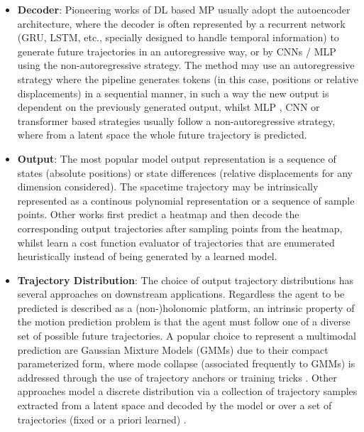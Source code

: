 \begin{itemize}
	\item \textbf{Decoder}: Pioneering works of DL based MP usually adopt the autoencoder architecture, where the decoder is often represented by a recurrent network (GRU, LSTM, etc., specially designed to handle temporal information) to generate future trajectories in an autoregressive way, or by CNNs \cite{gilles2021home} \cite{gilles2021gohome} / MLP \cite{liang2020learninggraph} \cite{schmidt2022crat} using the non-autoregressive strategy. The method may use an autoregressive strategy where the pipeline generates tokens (in this case, positions or relative displacements) in a sequential manner, in such a way the new output is dependent on the previously generated output, whilst MLP \cite{schmidt2022crat}, CNN \cite{gilles2021home} or transformer \cite{ngiam2021scene} based strategies usually follow a non-autoregressive strategy, where from a latent space the whole future trajectory is predicted.
	
	\item \textbf{Output}: The most popular model output representation is a sequence of states (absolute positions) or state differences (relative displacements for any dimension considered). The spacetime trajectory may be intrinsically represented as a continous polynomial representation or a sequence of sample points. Other works \cite{gilles2021home} \cite{gilles2021gohome} first predict a heatmap and then decode the corresponding output trajectories after sampling points from the heatmap, whilst \cite{casas2021mp3} \cite{zeng2019end} learn a cost function evaluator of trajectories that are enumerated heuristically instead of being generated by a learned model. 
	
	\item \textbf{Trajectory Distribution}: The choice of output trajectory distributions has several approaches on downstream applications. Regardless the agent to be predicted is described as a (non-)holonomic \cite{triggs1993motion} platform, an intrinsic property of the motion prediction problem is that the agent must follow one of a diverse set of possible future trajectories. A popular choice to represent a multimodal prediction are Gaussian Mixture Models (GMMs) due to their compact parameterized form, where mode collapse (associated frequently to GMMs) is addressed through the use of trajectory anchors \cite{chai2019multipath} or training  tricks \cite{cui2019multimodal}. Other approaches model a discrete distribution via a collection of trajectory samples extracted from a latent space and decoded by the model \cite{rhinehart2018r2p2} or over a set of trajectories (fixed or a priori learned) \cite{liang2020learninggraph}.
	
	
\end{itemize}

